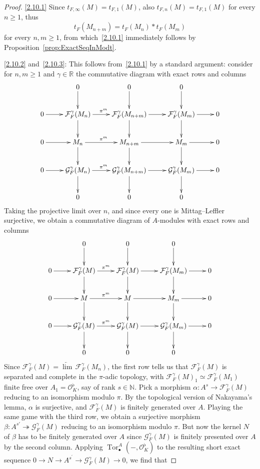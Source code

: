 \documentclass[11pt]{article}
\theoremstyle{definition}
\numberwithin{equation}{section}
\numberwithin{figure}{section}
\numberwithin{table}{section}
\DeclareMathOperator{\Tor}{Tor}
\begin{document}
\begin{proof}
\eqref{2.10.1} Since $t_{F,\infty}(M)=t_{F,1}(M)$, also $t_{F,n}(M)=t_{F,1}(M)$ for every $n\geq1$, thus
\[
t_{F}(M_{n+m})=t_{F}(M_{n})\ast t_{F}(M_{m})
\]
for every $n,m\geq1$, from which~\eqref{2.10.1} immediately follows by Proposition~\ref{prop:ExactSeqInModt}.

\eqref{2.10.2} and~\eqref{2.10.3}: This follows from~\eqref{2.10.1} by a standard argument: consider for $n,m\geq1$ and $\gamma\in\mathbb{R}$ the commutative diagram with exact rows and columns
\[
\xymatrix{ & 0\ar[d] & 0\ar[d] & 0\ar[d]\\
0\ar[r] & \mathcal{F}_{F}^{\gamma}(M_{n})\ar[d]\ar[r]^{\pi^{m}} & \mathcal{F}_{F}^{\gamma}(M_{n+m})\ar[d]\ar[r] & \mathcal{F}_{F}^{\gamma}(M_{m})\ar[d]\ar[r] & 0\\
0\ar[r] & M_{n}\ar[d]\ar[r]^{\pi^{m}} & M_{n+m}\ar[d]\ar[r] & M_{m}\ar[d]\ar[r] & 0\\
0\ar[r] & \mathcal{G}_{F}^{\gamma}(M_{n})\ar[d]\ar[r]^{\pi^{m}} & \mathcal{G}_{F}^{\gamma}(M_{n+m})\ar[d]\ar[r] & \mathcal{G}_{F}^{\gamma}(M_{m})\ar[d]\ar[r] & 0\\
& 0 & 0 & 0 }
\]
Taking the projective limit over $n$, and since every one is Mittag--Leffler surjective, we obtain a commutative diagram of $A$-modules with exact rows and columns
\[
\xymatrix{ & 0\ar[d] & 0\ar[d] & 0\ar[d]\\
0\ar[r] & \mathcal{F}_{F}^{\gamma}(M)\ar[d]\ar[r]^{\pi^{m}} & \mathcal{F}_{F}^{\gamma}(M)\ar[d]\ar[r] & \mathcal{F}_{F}^{\gamma}(M_{m})\ar[d]\ar[r] & 0\\
0\ar[r] & M\ar[d]\ar[r]^{\pi^{m}} & M\ar[d]\ar[r] & M_{m}\ar[d]\ar[r] & 0\\
0\ar[r] & \mathcal{G}_{F}^{\gamma}(M)\ar[d]\ar[r]^{\pi^{m}} & \mathcal{G}_{F}^{\gamma}(M)\ar[d]\ar[r] & \mathcal{G}_{F}^{\gamma}(M_{m})\ar[d]\ar[r] & 0\\
& 0 & 0 & 0 }
\]
Since $\mathcal{F}_{F}^{\gamma}(M)=\underleftarrow{\lim}\,\mathcal{F}_{F}^{\gamma}(M_{n})$, the first row tells us that $\mathcal{F}_{F}^{\gamma}(M)$ is separated and complete in the $\pi$-adic topology, with $\mathcal{F}_{F}^{\gamma}(M)_{1}\simeq\mathcal{F}_{F}^{\gamma}(M_{1})$ finite free over $A_{1}=\mathcal{O}_{K}^{\flat}$, say of rank $s\in\mathbb{N}$. Pick a morphism $\alpha:A^{s}\rightarrow\mathcal{F}_{F}^{\gamma}(M)$ reducing to an isomorphism modulo $\pi$. By the topological version of Nakayama's lemma, $\alpha$ is surjective, and $\mathcal{F}_{F}^{\gamma}(M)$ is finitely generated over $A$. Playing the same game with the third row, we obtain a surjective morphism $\beta:A^{s'}\twoheadrightarrow\mathcal{G}_{F}^{\gamma}(M)$ reducing to an isomorphism modulo $\pi$. But now the kernel $N$ of $\beta$ has to be finitely generated over $A$ since $\mathcal{G}_{F}^{\gamma}(M)$ is finitely presented over $A$ by the second column. Applying $\Tor_{\bullet}^{A}(-,\mathcal{O}_{K}^{\flat})$ to the resulting short exact sequence $0\rightarrow N\rightarrow A^{s^{\prime}}\rightarrow\mathcal{G}_{F}^{\gamma}(M)\rightarrow0$, we find that

\end{proof}
\end{document}
